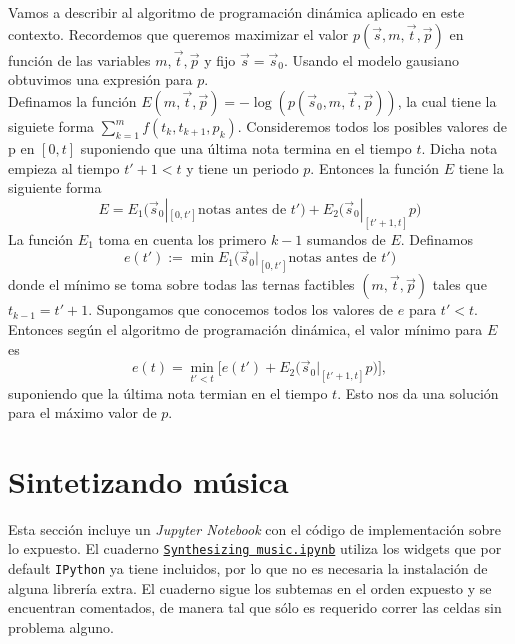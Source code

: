 \documentclass[a4paper]{article}
\begin{document}
Vamos a describir al algoritmo de programaci\'on din\'amica aplicado en este contexto.
Recordemos que queremos maximizar el valor $p(\vec{s},m,\vec{t},\vec{p})$ en funci\'on
de las variables $m,\vec{t},\vec{p}$ y fijo $\vec{s}=\vec{s}_0$. Usando el modelo gausiano
obtuvimos una expresi\'on para $p$.\\
Definamos la funci\'on $E(m,\vec{t},\vec{p})=-\log(p(\vec{s}_0,m,\vec{t},\vec{p}))$, la cual tiene
la siguiete forma $\sum_{k=1}^{m}f(t_k,t_{k+1},p_k)$. Consideremos todos los posibles valores
de p en $[0,t]$ suponiendo que una \'ultima nota termina en el tiempo $t$. Dicha nota empieza al tiempo
$t'+1<t$ y tiene un periodo $p$. Entonces la funci\'on $E$ tiene la siguiente forma
\begin{equation}
 E=E_1\Big(\vec{s}_0|_{[0,t']} \text{notas antes de }t'\Big) + E_2\Big(\vec{s}_0|_{[t'+1,t]}p\Big)
\end{equation}
La funci\'on $E_1$ toma en cuenta los primero $k-1$ sumandos de $E$. Definamos
\begin{equation}
 e(t'):=\min_{}E_1\Big(\vec{s}_0|_{[0,t']} \text{notas antes de }t'\Big)
\end{equation}
donde el m\'inimo se toma sobre todas las ternas factibles $(m,\vec{t},\vec{p})$ tales que 
$t_{k-1}=t'+1$. Supongamos que conocemos todos los valores de $e$  para $t'<t$. Entonces
seg\'un el algoritmo de programaci\'on din\'amica, el valor m\'inimo para $E$ es
\begin{equation}
 e(t)=\min_{t'<t}\big[ e(t')+E_2\Big(\vec{s}_0|_{[t'+1,t]}p\Big) \big],
\end{equation}
suponiendo que la \'ultima nota termian en el tiempo $t$. Esto nos da una soluci\'on para 
el m\'aximo valor de $p$.

\section{\sffamily Sintetizando música}

\noindent Esta sección incluye un \textit{Jupyter Notebook} con el código de implementación sobre lo expuesto. El cuaderno \href{https://github.com/RodolfoFerro/SynthesizingMusic/raw/master/Synthesizing\%20music.ipynb}{\texttt{Synthesizing music.ipynb}} utiliza los widgets que por default \texttt{IPython} ya tiene incluidos, por lo que no es necesaria la instalación de alguna librería extra. El cuaderno sigue los subtemas en el orden expuesto y se encuentran comentados, de manera tal que sólo es requerido correr las celdas sin problema alguno.\\
\end{document}
